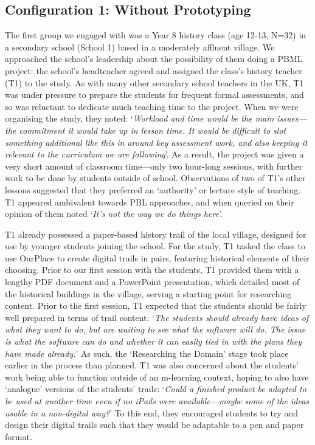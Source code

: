 \subsection{Configuration 1: Without Prototyping}
The first group we engaged with was a Year 8 history class (age 12-13, N=32) in a secondary school (School 1) based in a moderately affluent village. We approached the school's leadership about the possibility of them doing a PBML project: the school's headteacher agreed and assigned the class's history teacher (T1) to the study. As with many other secondary school teachers in the UK, T1 was under pressure to prepare the students for frequent formal assessments, and so was reluctant to dedicate much teaching time to the project. When we were organising the study, they noted: `\textit{Workload and time would be the main issues---the commitment it would take up in lesson time. It would be difficult to slot something additional like this in around key assessment work, and also keeping it relevant to the curriculum we are following}'. As a result, the project was given a very short amount of classroom time---only two hour-long sessions, with further work to be done by students outside of school. Observations of two of T1's other lessons suggested that they preferred an `authority' or lecture style of teaching. T1 appeared ambivalent towards PBL approaches, and when queried on their opinion of them noted `\textit{It's not the way we do things here}'.

T1 already possessed a paper-based history trail of the local village, designed for use by younger students joining the school. For the study, T1 tasked the class to use OurPlace to create digital trails in pairs, featuring historical elements of their choosing. Prior to our first session with the students, T1 provided them with a lengthy PDF document and a PowerPoint presentation, which detailed most of the historical buildings in the village, serving a starting point for researching content. Prior to the first session, T1 expected that the students should be fairly well prepared in terms of trail content: `\textit{The students should already have ideas of what they want to do, but are waiting to see what the software will do. The issue is what the software can do and whether it can easily tied in with the plans they have made already.}'  As such, the `Researching the Domain' stage took place earlier in the process than planned. T1 was also concerned about the students' work being able to function outside of an m-learning context, hoping to also have `analogue' versions of the students' trails: `\textit{Could a finished product be adapted to be used at another time even if no iPads were available---maybe some of the ideas usable in a non-digital way?}' To this end, they encouraged students to try and design their digital trails such that they would be adaptable to a pen and paper format.

